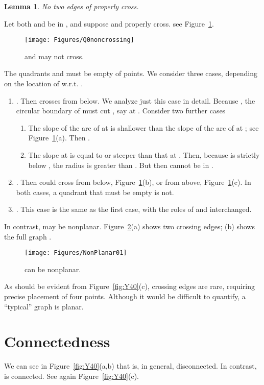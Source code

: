 \pdfoutput=1  \documentclass[]{article}
\newcommand{\ABox}{
\raisebox{3pt}{\framebox[6pt]{\rule{6pt}{0pt}}}
}
\newenvironment{proof}{{\bf Proof:}}{\hfill\ABox}
\newtheorem{lemma}[theorem]{Lemma}
\newcommand{\figlab}[1]{\label{fig:#1}}
\newcommand{\figref}[1]{\ref{fig:#1}}
\begin{document}
\begin{lemma}
No two edges of  properly cross.
\end{lemma}
\begin{proof}
Let both  and  be in , and suppose  and  properly cross.
see Figure~\figref{Q0noncrossing}.
\begin{figure}[htbp]
\centering
\texttt{[image: Figures/Q0noncrossing]}
\caption{ and  may not cross.}
\figlab{Q0noncrossing}
\end{figure}
The quadrants  and  must be empty of points.
We consider three cases, depending on the location of  w.r.t. .
\begin{enumerate}
\item .
Then  crosses  from below.  We analyze just this case in detail.
Because , the circular boundary of  must cut ,
say at .  Consider two further cases
\begin{enumerate}
\item The slope of the arc of  at  is shallower than the slope of the
arc of  at ; see Figure~\figref{Q0noncrossing}(a).
Then .
\item The slope at  is equal to or steeper than that at .
Then, because  is strictly below , the radius  is greater than
.
But then  cannot be in .
\end{enumerate}
\item .
Then  could cross  from below, Figure~\figref{Q0noncrossing}(b),
or from above, Figure~\figref{Q0noncrossing}(c).
In both cases, a quadrant that must be empty is not.
\item .
This case is the same as the first case, with the roles of  and  interchanged.
\end{enumerate}
\end{proof}

In contrast,  may be nonplanar.
Figure~\figref{NonPlanar01}(a) shows two crossing edges;
(b) shows the full graph .
\begin{figure}[htbp]
\centering
\texttt{[image: Figures/NonPlanar01]}
\caption{ can be nonplanar.}
\figlab{NonPlanar01}
\end{figure}


As should be evident from Figure~\figref{Y40}(c),
crossing edges are rare, requiring precise placement of four points.
Although it would be difficult to quantify, a ``typical''  graph
is planar.

\section{Connectedness}
We can see in Figure~\figref{Y40}(a,b)
that
 is, in general, disconnected.
In contrast,  is connected.
See again Figure~\figref{Y40}(c).
\end{document}

